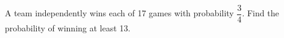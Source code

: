 A team independently wins each of 17 games with probability $\dfrac{3}{4}$. Find the probability of winning at least 13.
